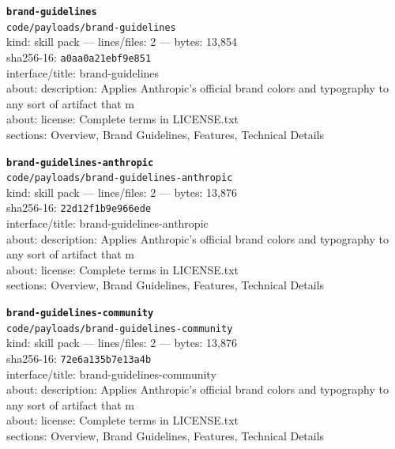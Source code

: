 \noindent\textbf{\texttt{brand-guidelines}}\\
\texttt{code/payloads/brand-guidelines}\\
kind: skill pack --- lines/files: 2 --- bytes: 13,854\\
sha256-16: \texttt{a0aa0a21ebf9e851}\\
interface/title: brand-guidelines\\
about: description: Applies Anthropic's official brand colors and typography to any sort of artifact that m\\
about: license: Complete terms in LICENSE.txt\\
sections: Overview, Brand Guidelines, Features, Technical Details\\
\vspace*{6.0pt}

\noindent\textbf{\texttt{brand-guidelines-anthropic}}\\
\texttt{code/payloads/brand-guidelines-anthropic}\\
kind: skill pack --- lines/files: 2 --- bytes: 13,876\\
sha256-16: \texttt{22d12f1b9e966ede}\\
interface/title: brand-guidelines-anthropic\\
about: description: Applies Anthropic's official brand colors and typography to any sort of artifact that m\\
about: license: Complete terms in LICENSE.txt\\
sections: Overview, Brand Guidelines, Features, Technical Details\\
\vspace*{6.0pt}
\newpage

\noindent\textbf{\texttt{brand-guidelines-community}}\\
\texttt{code/payloads/brand-guidelines-community}\\
kind: skill pack --- lines/files: 2 --- bytes: 13,876\\
sha256-16: \texttt{72e6a135b7e13a4b}\\
interface/title: brand-guidelines-community\\
about: description: Applies Anthropic's official brand colors and typography to any sort of artifact that m\\
about: license: Complete terms in LICENSE.txt\\
sections: Overview, Brand Guidelines, Features, Technical Details\\
\vspace*{6.0pt}

